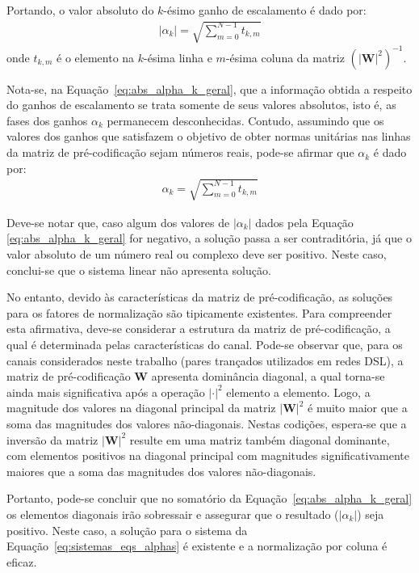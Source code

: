 Portando, o valor absoluto do $k$-ésimo ganho de escalamento é dado por:
\begin{align}
\left| \alpha_k \right| = \sqrt{ \sum \limits_{m=0}^{N-1} t_{k,m}}
\label{eq:abs_alpha_k_geral}
\end{align}
onde $t_{k,m}$ é o elemento na $k$-ésima linha e $m$-ésima coluna da matriz $\left( \left| \mathbf{W} \right|^2 \right)^{-1}$.

Nota-se, na Equação~\ref{eq:abs_alpha_k_geral}, que a informação obtida a respeito do ganhos de escalamento se trata somente de seus valores absolutos, isto é, as fases dos ganhos $\alpha_k$ permanecem desconhecidas. Contudo, assumindo que os valores dos ganhos que satisfazem o objetivo de obter normas unitárias nas linhas da matriz de pré-codificação sejam números reais, pode-se afirmar que $\alpha_k$ é dado por:
\begin{align}
\alpha_k = \sqrt{ \sum \limits_{m=0}^{N-1} t_{k,m}}
\label{eq:abs_alpha_k_real}
\end{align}

Deve-se notar que, caso algum dos valores de $\left| \alpha_k \right|$ dados pela Equação \ref{eq:abs_alpha_k_geral} for negativo, a solução passa a ser contraditória, já que o valor absoluto de um número real ou complexo deve ser positivo. Neste caso, conclui-se que o sistema linear não apresenta solução.

No entanto, devido às características da matriz de pré-codificação, as soluções para os fatores de normalização são tipicamente existentes. Para compreender esta afirmativa, deve-se considerar a estrutura da matriz de pré-codificação, a qual é determinada pelas características do canal. Pode-se observar que, para os canais considerados neste trabalho (pares trançados utilizados em redes DSL), a matriz de pré-codificação $\mathbf{W}$ apresenta dominância diagonal, a qual torna-se ainda mais significativa após a operação $\left| \cdot \right|^2$ elemento a elemento. Logo, a magnitude dos valores na diagonal principal da matriz $\left| \mathbf{W} \right|^2$ é muito maior que a soma das magnitudes dos valores não-diagonais. Nestas codições, espera-se que a inversão da matriz $\left| \mathbf{W} \right|^2$ resulte em uma matriz também diagonal dominante, com elementos positivos na diagonal principal com magnitudes significativamente maiores que a soma das magnitudes dos valores não-diagonais.

Portanto, pode-se concluir que no somatório da Equação~\ref{eq:abs_alpha_k_geral} os elementos diagonais irão sobressair e assegurar que o resultado ($\left| \alpha_k \right|$) seja positivo. Neste caso, a solução para o sistema da Equação~\ref{eq:sistemas_eqs_alphas} é existente e a normalização por coluna é eficaz. 

